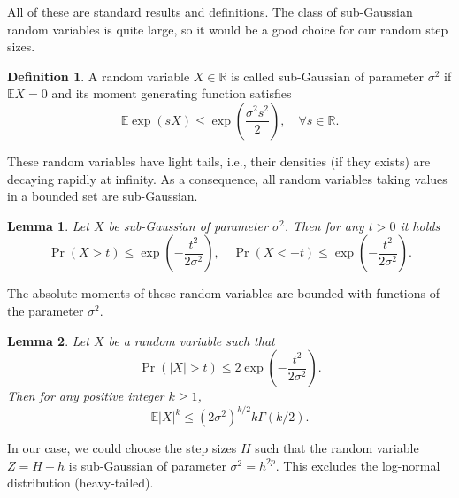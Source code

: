 \documentclass{scrartcl}
\theoremstyle{definition}
\newtheorem{definition}{Definition}
\theoremstyle{plain}
\newtheorem{lemma}{Lemma}
\newcommand{\E}{\mathbb{E}}
\newcommand{\R}{\mathbb{R}}
\begin{document}
	
	All of these are standard results and definitions. The class of sub-Gaussian random variables is quite large, so it would be a good choice for our random step sizes.
	
	\begin{definition} A random variable $X \in \R$ is called sub-Gaussian of parameter $\sigma^2$ if $\E X = 0$ and its moment generating function satisfies
		\begin{equation*}
			\E \exp(sX) \leq \exp\left(\frac{\sigma^2s^2}{2}\right), \quad \forall s \in \R.
		\end{equation*}
	\end{definition}
	
	\noindent These random variables have light tails, i.e., their densities (if they exists) are decaying rapidly at infinity. As a consequence, all random variables taking values in a bounded set are sub-Gaussian.
	
	\begin{lemma} Let $X$ be sub-Gaussian of parameter $\sigma^2$. Then for any $t > 0$ it holds
		\begin{equation*}
			\Pr(X > t) \leq \exp\left(-\frac{t^2}{2\sigma^2}\right), \quad \Pr(X < -t) \leq \exp\left(-\frac{t^2}{2\sigma^2}\right).
		\end{equation*}
	\end{lemma}
	
	\noindent The absolute moments of these random variables are bounded with functions of the parameter $\sigma^2$.
	
	\begin{lemma} Let $X$ be a random variable such that 
		\begin{equation*}
			\Pr(|X| > t) \leq 2 \exp\left(-\frac{t^2}{2\sigma^2}\right).
		\end{equation*}
		Then for any positive integer $k \geq 1$,
		\begin{equation*}
			\E |X|^k \leq (2\sigma^2)^{k/2}k\Gamma(k/2).
		\end{equation*}		
	\end{lemma}
	
	\noindent In our case, we could choose the step sizes $H$ such that the random variable $Z = H - h$ is sub-Gaussian of parameter $\sigma^2 = h^{2p}$. This excludes the log-normal distribution (heavy-tailed).
	
\end{document}
